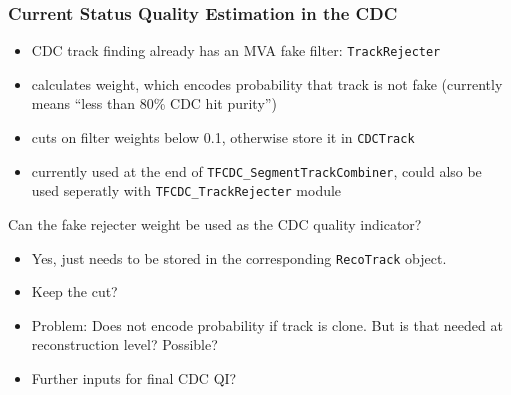 \documentclass[18pt]{beamer}
\begin{document}
\begin{frame}
  \frametitle{Current Status Quality Estimation in the CDC}
  \begin{itemize}
  \item CDC track finding already has an MVA fake filter: \texttt{TrackRejecter}
  \item calculates weight, which encodes probability that track is not fake (currently means ``less than 80\% CDC hit purity'')
  \item cuts on filter weights below 0.1, otherwise store it in \texttt{CDCTrack}
  \item currently used at the end of \texttt{TFCDC\_SegmentTrackCombiner}, could also be used seperatly with \texttt{TFCDC\_TrackRejecter} module
  \end{itemize}
  \begin{block}{Can the fake rejecter weight be used as the CDC quality indicator?}
    \begin{itemize}
    \item Yes, just needs to be stored in the corresponding \texttt{RecoTrack} object.
    \item Keep the cut?
    \item \textcolor{kit-red100}{Problem:} Does not encode probability if track is clone. But is that needed at reconstruction level? Possible?
    \item Further inputs for final CDC QI?
    \end{itemize}
  \end{block}

\end{frame}
\end{document}
